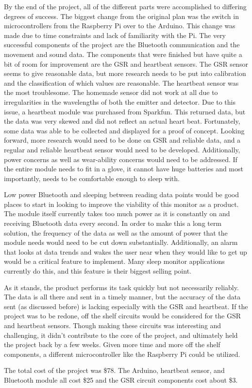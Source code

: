 \documentclass[finalProposal.tex]{subfiles}
\begin{document}
\onehalfspacing


\bigskip

By the end of the project, all of the different parts were accomplished to differing degrees of success. The biggest change from the original plan was the switch in microcontrollers from the Raspberry Pi over to the Arduino. This change was made due to time constraints and lack of familiarity with the Pi. The very successful components of the project are the Bluetooth communication and the movement and sound data. The components that were finished but have quite a bit of room for improvement are the GSR and heartbeat sensors. The GSR sensor seems to give reasonable data, but more research needs to be put into calibration and the classification of which values are reasonable. The heartbeat sensor was the most troublesome. The homemade sensor did not work at all due to irregularities in the wavelengths of both the emitter and detector. Due to this issue, a heartbeat module was purchased from Sparkfun. This returned data, but the data was very skewed and did not reflect an actual heart beat. Fortunately, some data was able to be collected and displayed for a proof of concept. Looking forward, more research would need to be done on GSR and reliable data, and a regular and reliable heartbeat sensor would need to be developed. Additionally, power concerns as well as wear-ability concerns would need to be addressed. If the entire module needs to fit in a glove, it cannot have huge batteries and most importantly, needs to be comfortable enough to sleep with.

Low power Bluetooth and sleeping between reading data points would be good places to start in looking to improve the viability of this monitor as a product. The module itself currently takes too much power as it is constantly on and receiving Bluetooth data every second. In order to make this a long term solution, the frequency of the data as well as the amount of power that the module needs would need to be cut down substantially. Additionally, an alarm that looks at data trends and wakes the user near when they would like to get up would be a critical feature to implement. Many sleep monitor applications currently do this, and this feature is their biggest selling point.

As it stands, the product performs its task quickly but not necessarily reliably. The data is all there and sent in a timely manner, but the accuracy of the data sent (as discussed before) is lacking especially with the GSR and heartbeat. If the project was to be redone, off the shelf circuits would be considered for the GSR and heartbeat sensors. Though making these circuits was interesting and challenging, it didn't contribute to the core of the project, and ultimately held the project back by a few weeks. Given more time and more off the shelf components, a different microcontroller like the Raspberry Pi could be utilized.

The total cost of the project was \$78. The Arduino, heartbeat sensor, and Bluetooth module all cost \$25 and the GSR circuit components cost about \$3.
\end{document}
